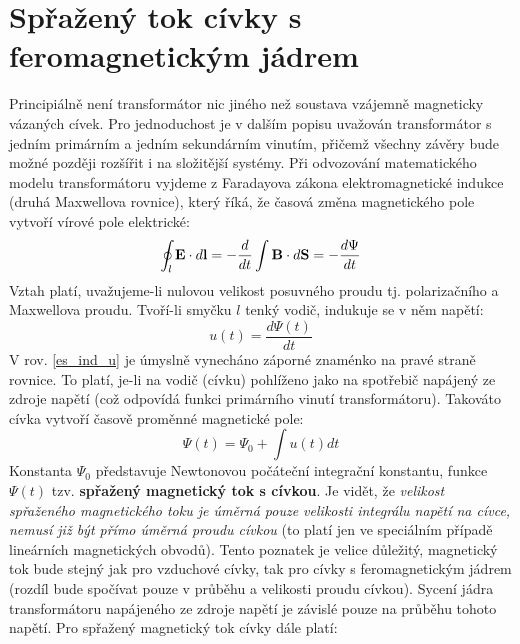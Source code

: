     \section{Spřažený tok cívky s feromagnetickým jádrem}\label{es:tokcvk_frmj}
      Principiálně není transformátor nic jiného než soustava vzájemně magneticky vá\-za\-ných
      cívek. Pro jednoduchost je v dalším popisu uvažován transformátor s jedním pri\-már\-ním a
      jedním sekundárním vinutím, přičemž všechny závěry bude možné později rozšířit i na
      složitější systémy. Při odvozování matematického modelu transformátoru vy\-jde\-me z
      Faradayova zákona elektromagnetické indukce (druhá Maxwellova rovnice), který říká, že časová
      změna magnetického pole vytvoří vírové pole elektrické:
      \begin{equation}\label{es:eq_elmag_ind}
        \oint_l \mathbf{E} \cdot d\mathbf{l} = - \frac{d}{dt}\int\mathbf{B}\cdot d\mathbf{S} =- \frac{d\Psi}{dt}
      \end{equation}
      Vztah platí, uvažujeme-li nulovou velikost posuvného proudu tj. polarizačního a Maxwellova
      proudu. Tvoří-li smyčku $l$ tenký vodič, indukuje se v něm napětí:
      \begin{equation}\label{es_ind_u}
        u(t) = \frac{d\Psi(t)}{dt}
      \end{equation}
      V rov. \ref{es_ind_u} je úmyslně vynecháno záporné znaménko na pravé straně rovnice. To
      platí, je-li na vodič (cívku) pohlíženo jako na spotřebič napájený ze zdroje napětí (což
      odpovídá funkci primárního vinutí transformátoru). Takováto cívka vytvoří časově proměnné
      magnetické pole:
      \begin{equation}\label{es:eq_tok1}
        \Psi(t) = \Psi_0 + \int u(t)dt
      \end{equation}
      Konstanta $\Psi_0$ představuje Newtonovou počáteční integrační konstantu, fun\-kce $\Psi(t)$
      tzv. \textbf{spřažený magnetický tok s cívkou}. Je vidět, že \emph{velikost spřa\-že\-ného
      magnetického toku je úměrná pouze velikosti integrálu napětí na cívce, nemusí již být přímo
      úměrná proudu cívkou} (to platí jen ve speciálním případě lineárních magnetických obvodů).
      Tento poznatek je velice důležitý, magnetický tok bude stejný jak pro vzduchové cívky, tak
      pro cívky s feromagnetickým jádrem (rozdíl bude spočívat pouze v průběhu a velikosti proudu
      cívkou). Sycení jádra transformátoru napájeného ze zdroje napětí je závislé pouze na průběhu
      tohoto napětí. Pro spřažený magnetický tok cívky dále platí:

